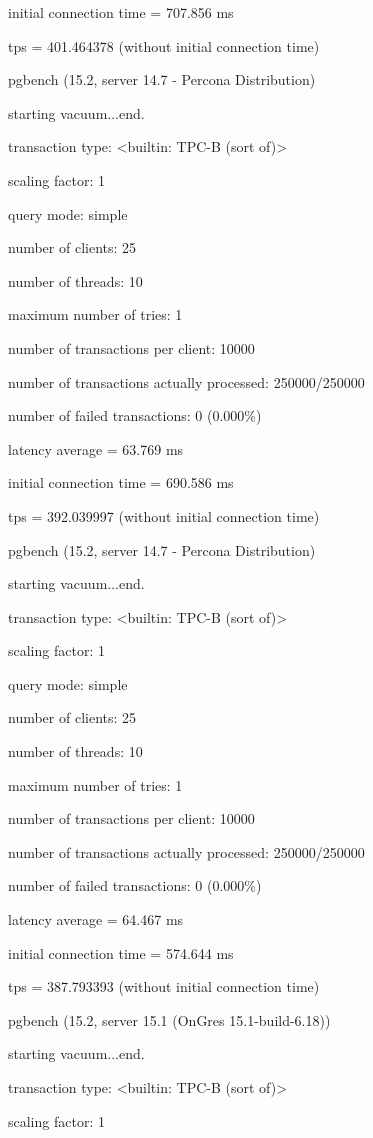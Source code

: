 initial connection time = 707.856 ms

tps = 401.464378 (without initial connection time)

pgbench (15.2, server 14.7 - Percona Distribution)

starting vacuum...end.

transaction type: <builtin: TPC-B (sort of)>

scaling factor: 1

query mode: simple

number of clients: 25

number of threads: 10

maximum number of tries: 1

number of transactions per client: 10000

number of transactions actually processed: 250000/250000

number of failed transactions: 0 (0.000\%)

latency average = 63.769 ms

initial connection time = 690.586 ms

tps = 392.039997 (without initial connection time)

pgbench (15.2, server 14.7 - Percona Distribution)

starting vacuum...end.

transaction type: <builtin: TPC-B (sort of)>

scaling factor: 1

query mode: simple

number of clients: 25

number of threads: 10

maximum number of tries: 1

number of transactions per client: 10000

number of transactions actually processed: 250000/250000

number of failed transactions: 0 (0.000\%)

latency average = 64.467 ms

initial connection time = 574.644 ms

tps = 387.793393 (without initial connection time)


pgbench (15.2, server 15.1 (OnGres 15.1-build-6.18))

starting vacuum...end.

transaction type: <builtin: TPC-B (sort of)>

scaling factor: 1

